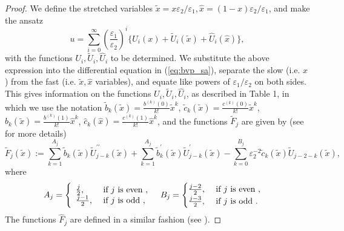 \documentclass[12pt]{article}
\newcommand{\eps}{\varepsilon}
\begin{document}
\begin{proof}
We define the stretched variables  $\tilde{x} = x \eps_2 / \eps_1 ,  \hat{x} = (1-x) \eps_2 / \eps_1$, and make the ansatz
%
$$
u = \sum_{i=0}^{\infty} \left( \frac{\eps_1}{\eps_2} \right)^i \{ U_i(x) + \tilde{U}_i(\tilde{x}) + \hat{U}_i (\hat{x})\},
$$
with the functions $U_i , \tilde{U}_i , \hat{U}_i $ to be determined. We substitute the above expression into the differential equation in (\ref{eq:bvp_sa}), separate the slow (i.e.  $x$) from the fast (i.e. $\tilde{x}, \hat{x}$ variables), and equate like powers of $\eps_1 / \eps_2$ on both sides. This gives information on the functions $U_i , \tilde{U}_i , \hat{U}_i $, as described in Table 1, in which we use the notation
$\tilde{b}_k(\tilde{x})=\frac{b^{(k)}(0)}{k!} \tilde{x}^k$, $\tilde{c}_k(\tilde{x})=\frac{c^{(k)}(0)}{k!} \tilde{x}^k$,  $\hat{b}_k(\tilde{x})=\frac{b^{(k)}(1)}{k!} \hat{x}^k$, $\hat{c}_k(\hat{x})=\frac{c^{(k)}(1)}{k!} \hat{x}^k$, and the functions $\tilde{F}_j$ are given by  (see \cite{PCarXiv} for more details)
%
\begin{equation}\label{Fj}
\tilde{F}_j(\tilde{x}):=\sum_{k=1}^{A_j} \tilde{b}_k(\tilde{x}) \tilde{U}_{j-k}^{\prime \prime}(\tilde{x})+\sum_{k=1}^{A_j} \tilde{b}_k^{\prime}(\tilde{x}) \tilde{U}_{j-k}^{\prime}(\tilde{x})-\sum_{k=0}^{B_j} \eps_2^{-2} \tilde{c}_k(\tilde{x}) \tilde{U}_{j-2-k}(\tilde{x}), 
\end{equation}
%
where
\begin{equation*}
\begin{aligned}
&A_j=\left\{\begin{array}{ll}
\frac{j}{2}, & \text { if } j \text { is even }, \\
\frac{j-1}{2}, & \text { if } j \text { is odd },
\end{array} \quad B_j= \begin{cases}\frac{j-2}{2}, & \text { if } j \text { is even }, \\
\frac{j-3}{2}, & \text { if } j \text { is odd } .\end{cases}\right. \notag
\end{aligned}
\end{equation*}
%
The functions $\hat{F}_j$ are defined in a similar fashion (see \cite{PCarXiv}).




\end{proof}
\end{document}
